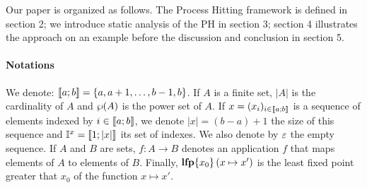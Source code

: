 Our paper is organized as follows.
The Process Hitting framework is defined in section 2;
we introduce static analysis of the PH in section 3;
section 4 illustrates the approach on an example
before the discussion and conclusion in section 5.

\paragraph*{Notations}
We denote: $\llbracket a; b \rrbracket = \{ a, a+1, \dots, b-1, b \}$.
If $A$ is a finite set,
$|A|$ is the cardinality of $A$
and $\wp(A)$ is the power set of $A$.
If $x = (x_i)_{i \in \llbracket a; b \rrbracket}$ is a sequence of elements indexed by $i \in \llbracket a; b \rrbracket$,
we denote $|x| = (b-a)+1$ the size of this sequence
and $\mathbb{I}^{x} = \llbracket 1; |x| \rrbracket$ its set of indexes.
We also denote by $\varepsilon$ the empty sequence.
If $A$ and $B$ are sets,
$f : A \rightarrow B$ denotes an application $f$ that maps elements of $A$ to elements of $B$.
Finally, $\mathbf{lfp}\{x_0\}\left(x\mapsto x'\right)$ is the least fixed point greater that $x_0$ of the function $x \mapsto x'$.